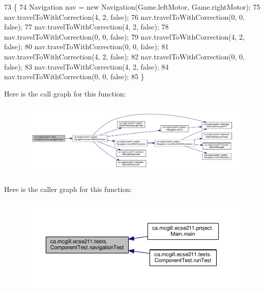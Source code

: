 \begin{DoxyCode}
73                                                                 \{
74     Navigation nav = \textcolor{keyword}{new} Navigation(Game.leftMotor, Game.rightMotor);
75     nav.travelToWithCorrection(4, 2, \textcolor{keyword}{false});
76     nav.travelToWithCorrection(0, 0, \textcolor{keyword}{false});
77     nav.travelToWithCorrection(4, 2, \textcolor{keyword}{false});
78     nav.travelToWithCorrection(0, 0, \textcolor{keyword}{false});
79     nav.travelToWithCorrection(4, 2, \textcolor{keyword}{false});
80     nav.travelToWithCorrection(0, 0, \textcolor{keyword}{false});
81     nav.travelToWithCorrection(4, 2, \textcolor{keyword}{false});
82     nav.travelToWithCorrection(0, 0, \textcolor{keyword}{false});
83     nav.travelToWithCorrection(4, 2, \textcolor{keyword}{false});
84     nav.travelToWithCorrection(0, 0, \textcolor{keyword}{false});
85   \}
\end{DoxyCode}
Here is the call graph for this function\+:\nopagebreak
\begin{figure}[H]
\begin{center}
\leavevmode
\includegraphics[width=350pt]{enumca_1_1mcgill_1_1ecse211_1_1tests_1_1_component_test_aa40592bb550b3526402faddbc0d890c7_cgraph}
\end{center}
\end{figure}
Here is the caller graph for this function\+:\nopagebreak
\begin{figure}[H]
\begin{center}
\leavevmode
\includegraphics[width=350pt]{enumca_1_1mcgill_1_1ecse211_1_1tests_1_1_component_test_aa40592bb550b3526402faddbc0d890c7_icgraph}
\end{center}
\end{figure}
\mbox{\label{enumca_1_1mcgill_1_1ecse211_1_1tests_1_1_component_test_a1ecca45b47067d825683cf46dcf22b62}} 

